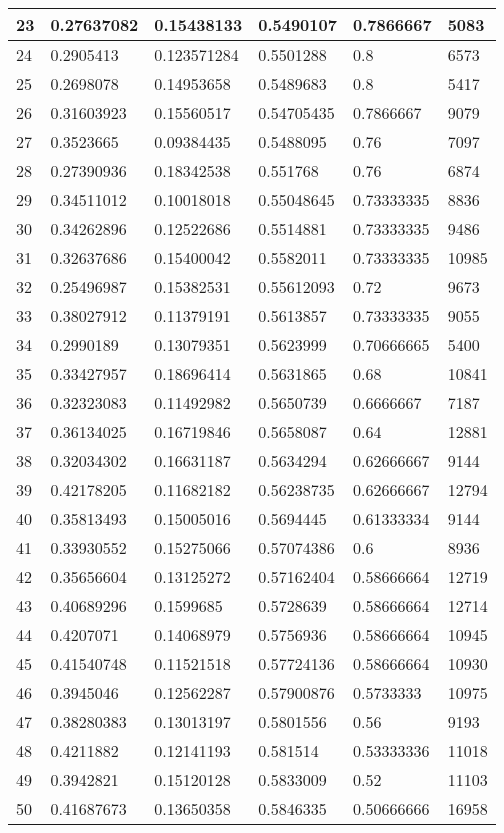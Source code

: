 \begin{longtable}{|l|l|l|l|l|l|}
23 & 0.27637082 & 0.15438133 & 0.5490107 & 0.7866667 & 5083 \\ \hline 
24 & 0.2905413 & 0.123571284 & 0.5501288 & 0.8 & 6573 \\ \hline 
25 & 0.2698078 & 0.14953658 & 0.5489683 & 0.8 & 5417 \\ \hline 
26 & 0.31603923 & 0.15560517 & 0.54705435 & 0.7866667 & 9079 \\ \hline 
27 & 0.3523665 & 0.09384435 & 0.5488095 & 0.76 & 7097 \\ \hline 
28 & 0.27390936 & 0.18342538 & 0.551768 & 0.76 & 6874 \\ \hline 
29 & 0.34511012 & 0.10018018 & 0.55048645 & 0.73333335 & 8836 \\ \hline 
30 & 0.34262896 & 0.12522686 & 0.5514881 & 0.73333335 & 9486 \\ \hline 
31 & 0.32637686 & 0.15400042 & 0.5582011 & 0.73333335 & 10985 \\ \hline 
32 & 0.25496987 & 0.15382531 & 0.55612093 & 0.72 & 9673 \\ \hline 
33 & 0.38027912 & 0.11379191 & 0.5613857 & 0.73333335 & 9055 \\ \hline 
34 & 0.2990189 & 0.13079351 & 0.5623999 & 0.70666665 & 5400 \\ \hline 
35 & 0.33427957 & 0.18696414 & 0.5631865 & 0.68 & 10841 \\ \hline 
36 & 0.32323083 & 0.11492982 & 0.5650739 & 0.6666667 & 7187 \\ \hline 
37 & 0.36134025 & 0.16719846 & 0.5658087 & 0.64 & 12881 \\ \hline 
38 & 0.32034302 & 0.16631187 & 0.5634294 & 0.62666667 & 9144 \\ \hline 
39 & 0.42178205 & 0.11682182 & 0.56238735 & 0.62666667 & 12794 \\ \hline 
40 & 0.35813493 & 0.15005016 & 0.5694445 & 0.61333334 & 9144 \\ \hline 
41 & 0.33930552 & 0.15275066 & 0.57074386 & 0.6 & 8936 \\ \hline 
42 & 0.35656604 & 0.13125272 & 0.57162404 & 0.58666664 & 12719 \\ \hline 
43 & 0.40689296 & 0.1599685 & 0.5728639 & 0.58666664 & 12714 \\ \hline 
44 & 0.4207071 & 0.14068979 & 0.5756936 & 0.58666664 & 10945 \\ \hline 
45 & 0.41540748 & 0.11521518 & 0.57724136 & 0.58666664 & 10930 \\ \hline 
46 & 0.3945046 & 0.12562287 & 0.57900876 & 0.5733333 & 10975 \\ \hline 
47 & 0.38280383 & 0.13013197 & 0.5801556 & 0.56 & 9193 \\ \hline 
48 & 0.4211882 & 0.12141193 & 0.581514 & 0.53333336 & 11018 \\ \hline 
49 & 0.3942821 & 0.15120128 & 0.5833009 & 0.52 & 11103 \\ \hline 
50 & 0.41687673 & 0.13650358 & 0.5846335 & 0.50666666 & 16958 \\ \hline 
\end{longtable}